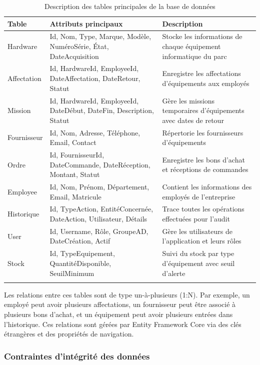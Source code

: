 \begin{longtable}{|m{3cm}|m{4cm}|m{6cm}|}
\hline
\textbf{Table} & \textbf{Attributs principaux} & \textbf{Description} \\
\hline
\endhead
\endfoot
\endlastfoot
\hline
Hardware & Id, Nom, Type, Marque, Modèle, NuméroSérie, État, DateAcquisition & Stocke les informations de chaque équipement informatique du parc \\
\hline
Affectation & Id, HardwareId, EmployeeId, DateAffectation, DateRetour, Statut & Enregistre les affectations d'équipements aux employés \\
\hline
Mission & Id, HardwareId, EmployeeId, DateDébut, DateFin, Description, Statut & Gère les missions temporaires d'équipements avec dates de retour \\
\hline
Fournisseur & Id, Nom, Adresse, Téléphone, Email, Contact & Répertorie les fournisseurs d'équipements \\
\hline
Ordre & Id, FournisseurId, DateCommande, DateRéception, Montant, Statut & Enregistre les bons d'achat et réceptions de commandes \\
\hline
Employee & Id, Nom, Prénom, Département, Email, Matricule & Contient les informations des employés de l'entreprise \\
\hline
Historique & Id, TypeAction, EntitéConcernée, DateAction, Utilisateur, Détails & Trace toutes les opérations effectuées pour l'audit \\
\hline
User & Id, Username, Rôle, GroupeAD, DateCréation, Actif & Gère les utilisateurs de l'application et leurs rôles \\
\hline
Stock & Id, TypeEquipement, QuantitéDisponible, SeuilMinimum & Suivi du stock par type d'équipement avec seuil d'alerte \\
\hline
\captionsetup{justification=centering,margin=1cm}
\caption{Description des tables principales de la base de données}
\end{longtable}

Les relations entre ces tables sont de type un-à-plusieurs (1:N). Par exemple, un employé peut avoir plusieurs affectations, un fournisseur peut être associé à plusieurs bons d'achat, et un équipement peut avoir plusieurs entrées dans l'historique. Ces relations sont gérées par Entity Framework Core via des clés étrangères et des propriétés de navigation.

\subsubsection{Contraintes d'intégrité des données}

